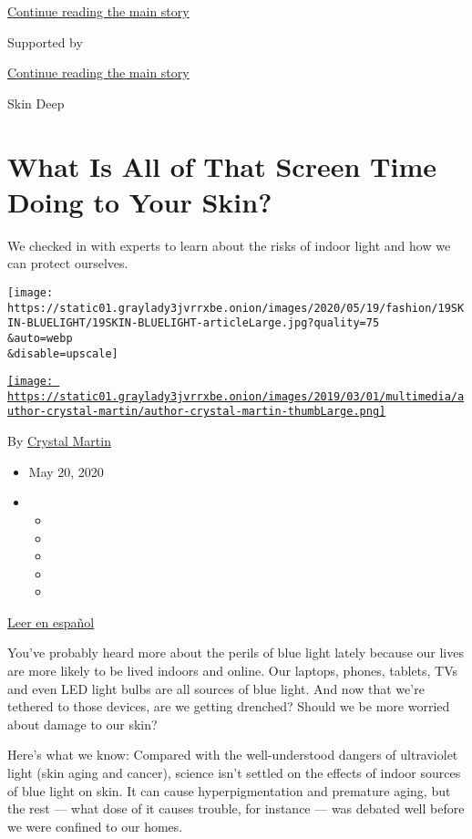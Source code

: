 \protect\hyperlink{after-top}{Continue reading the main story}

Supported by

\protect\hyperlink{after-sponsor}{Continue reading the main story}

Skin Deep

\hypertarget{what-is-all-of-that-screen-time-doing-to-your-skin}{%
\section{What Is All of That Screen Time Doing to Your
Skin?}\label{what-is-all-of-that-screen-time-doing-to-your-skin}}

We checked in with experts to learn about the risks of indoor light and
how we can protect ourselves.

\texttt{[image: https://static01.graylady3jvrrxbe.onion/images/2020/05/19/fashion/19SKIN-BLUELIGHT/19SKIN-BLUELIGHT-articleLarge.jpg?quality=75\\\&auto=webp\\\&disable=upscale]}

\href{https://www.nytimes3xbfgragh.onion/by/crystal-martin}{\texttt{[image: https://static01.graylady3jvrrxbe.onion/images/2019/03/01/multimedia/author-crystal-martin/author-crystal-martin-thumbLarge.png]}}

By \href{https://www.nytimes3xbfgragh.onion/by/crystal-martin}{Crystal
Martin}

\begin{itemize}
\item
  May 20, 2020
\item
  \begin{itemize}
  \item
  \item
  \item
  \item
  \item
  \end{itemize}
\end{itemize}

\href{https://www.nytimes3xbfgragh.onion/es/2020/05/26/espanol/estilos-de-vida/efectos-luz-pantalla-piel.html}{Leer
en español}

You've probably heard more about the perils of blue light lately because
our lives are more likely to be lived indoors and online. Our laptops,
phones, tablets, TVs and even LED light bulbs are all sources of blue
light. And now that we're tethered to those devices, are we getting
drenched? Should we be more worried about damage to our skin?

Here's what we know: Compared with the well-understood dangers of
ultraviolet light (skin aging and cancer), science isn't settled on the
effects of indoor sources of blue light on skin. It can cause
hyperpigmentation and premature aging, but the rest --- what dose of it
causes trouble, for instance --- was debated well before we were
confined to our homes.

